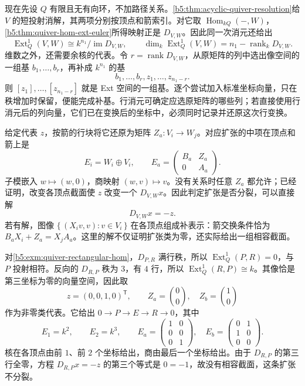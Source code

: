 现在先设 \(Q\) 有限且无有向环，不加路径关系。\cref{b5:thm:acyclic-quiver-resolution}给 \(V\) 的短投射消解，其两项分别按顶点和箭索引。对它取 \(\operatorname{Hom}_{kQ}(-,W)\)，\cref{b5:thm:quiver-hom-ext-euler}所得映射正是 \(D_{V,W}\)。因此同一次消元还给出
\begin{equation}\label{b5:eq:quiver-computational-ext}
	\operatorname{Ext}_Q^1(V,W)\cong k^{n_1}/\operatorname{im}D_{V,W},
	\qquad \dim_k\operatorname{Ext}_Q^1(V,W)=n_1-\operatorname{rank}_kD_{V,W}.
\end{equation}
维数之外，还需要余核的代表。令 \(r=\operatorname{rank}D_{V,W}\)，从原矩阵的列中选出像空间的一组基 \(b_1,\ldots,b_r\)，再补成 \(k^{n_1}\) 的基
\[
	b_1,\ldots,b_r,z_1,\ldots,z_{n_1-r}.
\]
则 \([z_1],\ldots,[z_{n_1-r}]\) 就是 Ext 空间的一组基。逐个尝试加入标准坐标向量，只在秩增加时保留，便能完成补基。行消元可确定应选原矩阵的哪些列；若直接使用行消元后的列向量，它们已在变换后的坐标中，必须同时记录并还原这次行变换。

\ProseParagraphBreak
给定代表 \(z\)，按箭的行块将它还原为矩阵 \(Z_a:V_i\to W_j\)。对应扩张的中项在顶点和箭上是
\[
	E_i=W_i\oplus V_i,\qquad
	E_a=\begin{pmatrix}B_a&Z_a\\0&A_a\end{pmatrix}.
\]
子模嵌入 \(w\mapsto(w,0)\)，商映射 \((w,v)\mapsto v\)。没有关系时任意 \(Z_a\) 都允许；已经证明，改变各顶点截面使 \(z\) 改变一个 \(D_{V,W}x\)。因此判定扩张是否分裂，可以直接解
\[
	D_{V,W}x=-z.
\]
若有解，图像 \(\{\,(X_iv,v):v\in V_i\,\}\) 在各顶点组成补表示：箭交换条件恰为 \(B_aX_i+Z_a=X_jA_a\)。这里的解不仅证明扩张类为零，还实际给出一组相容截面。

\ProseParagraphBreak
对\cref{b5:exm:quiver-rectangular-hom}，\(D_{P,R}\) 满行秩，所以 \(\operatorname{Ext}_Q^1(P,R)=0\)，与 \(P\) 投射相符。反向的 \(D_{R,P}\) 秩为 \(3\)，有 \(4\) 行，所以 \(\operatorname{Ext}_Q^1(R,P)\cong k\)。其像恰是第三坐标为零的向量空间，因此取
\[
	z=(0,0,1,0)^{\mathsf T},\qquad Z_a=\binom00,\quad Z_b=\binom10
\]
作为非零类代表。它给出 \(0\to P\to E\to R\to0\)，其中
\[
	E_1=k^2,\qquad E_2=k^3,\qquad
	E_a=\begin{pmatrix}1&0\\0&0\\0&1\end{pmatrix},\quad
	E_b=\begin{pmatrix}0&1\\1&0\\0&0\end{pmatrix}.
\]
核在各顶点由前 \(1\)、前 \(2\) 个坐标给出，商由最后一个坐标给出。由于 \(D_{R,P}\) 的第三行全零，方程 \(D_{R,P}x=-z\) 的第三个等式是 \(0=-1\)，故没有相容截面，这条扩张不分裂。

